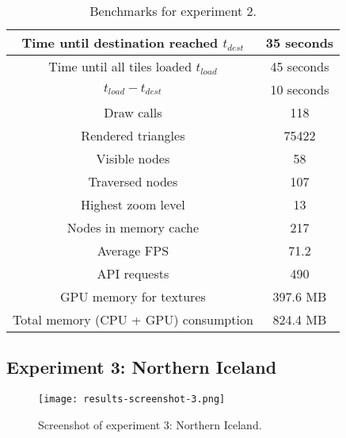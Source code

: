 \begin{table}[H]
  \begin{center}
    \begin{tabular}{ c|c }
      Time until destination reached $t_{dest}$ & 35 seconds \\
      \hline
      Time until all tiles loaded $t_{load}$ & 45 seconds \\
      \hline
      $t_{load} - t_{dest}$ & 10 seconds \\
      \hline
      Draw calls & 118 \\
      \hline
      Rendered triangles & 75422 \\
      \hline
      Visible nodes & 58 \\
      \hline
      Traversed nodes & 107 \\
      \hline
      Highest zoom level & 13 \\
      \hline
      Nodes in memory cache & 217 \\
      \hline
      Average FPS & 71.2 \\
      \hline 
      API requests & 490 \\
      \hline
      GPU memory for textures & 397.6 MB \\
      \hline
      Total memory (CPU + GPU) consumption & 824.4 MB \\
    \end{tabular}
  \end{center}
  \caption{Benchmarks for experiment 2.}\label{tbl:results-2}
  \end{table}

\subsection{Experiment 3: Northern Iceland}
\begin{figure}[H]
  \centering
  \texttt{[image: results-screenshot-3.png]}
  \caption{Screenshot of experiment 3: Northern Iceland.}\label{fig:results-screenshot-3}
\end{figure}

